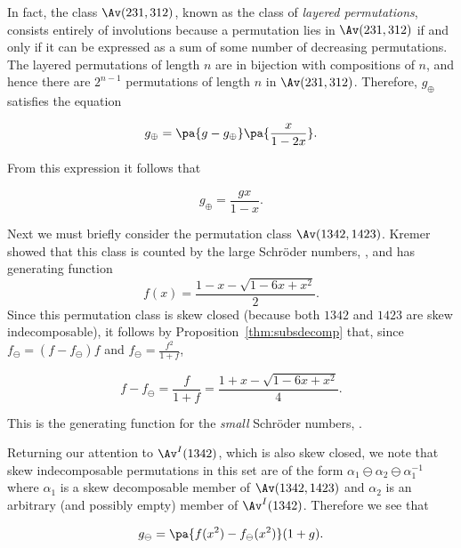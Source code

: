 \documentclass[12pt,twoside]{memoir}
\begin{document}
      In fact, the class $\Av(231,312)$, known as the class of \emph{layered
      permutations}, consists entirely of involutions because a permutation lies in
      $\Av(231,312)$ if and only if it can be expressed as a sum of some number of
      decreasing permutations. The layered permutations of length $n$ are in
      bijection with compositions of $n$, and hence there are $2^{n-1}$
      permutations of length $n$ in $\Av(231,312)$. Therefore, $g_\oplus$ satisfies
      the equation 
      
      $$ g_\oplus = \pa{g - g_\oplus}\pa{\frac{x}{1-2x}}. $$

      From this expression it follows that

        \begin{equation}
        \label{involutions:eqn:1342-1}
        g_\oplus = \frac{gx}{1-x}.
        \end{equation}

      Next we must briefly consider the permutation class $\Av(1342,1423)$.
      Kremer~\cite{Kremer2000, KremerPS} showed that
      this class is counted by the large Schr\"oder numbers, , and
      has generating function 
      $$ f(x) = \frac{1-x-\sqrt{1-6x+x^2}}{2}. $$
      Since this permutation class is skew closed (because both $1342$ and $1423$
      are skew indecomposable), it follows by Proposition~\ref{thm:subsdecomp}
      that, since 
      $f_\ominus = (f - f_\ominus)f$ and $f_\ominus = \frac{f^2}{1+f}$, 

      $$ f - f_\ominus = \frac{f}{1+f} = \frac{1+x-\sqrt{1-6x+x^2}}{4}. $$

      This is the generating function for the \emph{small} Schr\"oder numbers,
      . 


      Returning our attention to $\Av^I(1342)$, which is also skew closed, we
      note that skew indecomposable permutations in this set are of the form
      $\alpha_1\ominus\alpha_2\ominus\alpha_1^{-1}$ where $\alpha_1$ is a skew
      decomposable member of $\Av(1342,1423)$ and $\alpha_2$ is an arbitrary (and
      possibly empty) member of $\Av^I(1342)$. Therefore we see that

      \begin{equation}
        \label{involutions:eqn:1342-2}
        g_\ominus = \pa{f(x^2)-f_\ominus(x^2)}(1+g).
      \end{equation}
        
\end{document}

